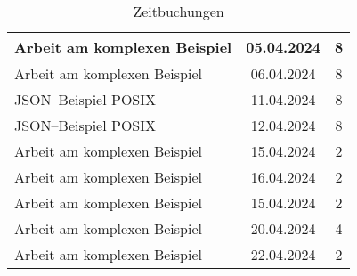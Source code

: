 \begin{table}[H]
\begin{tabular}{|l|c|c|}
        \hline
        Arbeit am komplexen Beispiel           & 05.04.2024 & 8              \\
        \hline
        Arbeit am komplexen Beispiel           & 06.04.2024 & 8              \\
        \hline
        \ac{JSON}--Beispiel \ac{POSIX}         & 11.04.2024 & 8              \\
        \hline
        \ac{JSON}--Beispiel \ac{POSIX}         & 12.04.2024 & 8              \\
        \hline
        Arbeit am komplexen Beispiel           & 15.04.2024 & 2              \\
        \hline
        Arbeit am komplexen Beispiel           & 16.04.2024 & 2              \\
        \hline
        Arbeit am komplexen Beispiel           & 15.04.2024 & 2              \\
        \hline
        Arbeit am komplexen Beispiel           & 20.04.2024 & 4              \\
        \hline
        Arbeit am komplexen Beispiel           & 22.04.2024 & 2              \\
        \hline
    \end{tabular}
    \caption{Zeitbuchungen}
    \label{tab:zeitbuchungen-long}
\end{table}

